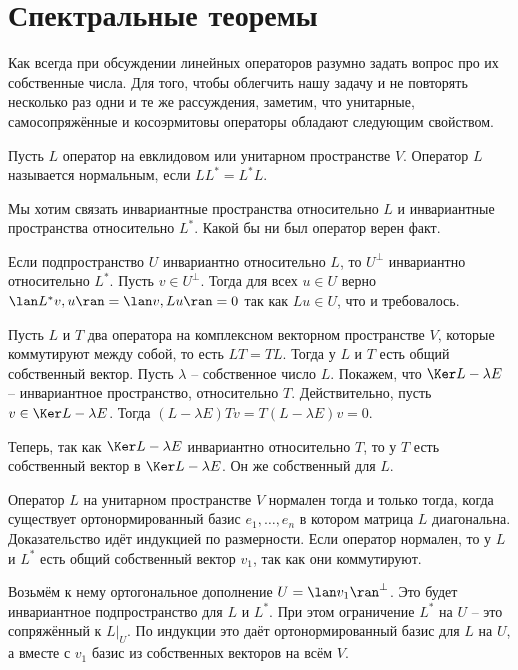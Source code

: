 \section{Спектральные теоремы}

Как всегда при обсуждении линейных операторов разумно задать вопрос про их собственные числа. Для того, чтобы облегчить нашу задачу и не повторять несколько раз одни и те же рассуждения, заметим, что унитарные, самосопряжённые и косоэрмитовы операторы обладают следующим свойством.

\dfn Пусть $L$ оператор на евклидовом или унитарном пространстве $V$. Оператор $L$ называется нормальным, если $LL^*=L^*L$.
\edfn



Мы хотим связать инвариантные пространства относительно $L$ и инвариантные пространства относительно $L^*$. Какой бы ни был оператор верен факт.

\lm \label{normal} Если подпространство $U$ инвариантно относительно $L$, то $U^{\bot}$ инвариантно относительно $L^{*}$.
\proof Пусть $v\in U^{\bot}$. Тогда для всех $u\in U$ верно $\lan L^* v, u\ran = \lan v, Lu\ran =0 $ так как $Lu\in U$, что и требовалось.
\endproof
\elm

\lm Пусть $L$ и $T$ два оператора на комплексном векторном пространстве $V$, которые коммутируют между собой, то есть $LT=TL$. Тогда у $L$ и $T$ есть общий собственный вектор. 
\proof Пусть $\lambda$ -- собственное число $L$. Покажем, что $\Ker L -\lambda E$ -- инвариантное пространство, относительно $T$. Действительно, пусть $v\in \Ker L-\lambda E$. Тогда $(L-\lambda E)Tv=T(L-\lambda E)v=0$.

Теперь, так как $\Ker L-\lambda E$ инвариантно относительно $T$, то у $T$ есть собственный вектор в $\Ker L-\lambda E$. Он же собственный для $L$.
\endproof
\elm

\thrm 
Оператор $L$ на  унитарном пространстве $V$ нормален тогда и только тогда, когда существует ортонормированный базис $e_1,\dots,e_n$ в котором матрица $L$ диагональна.
\proof
Доказательство идёт индукцией по размерности. Если оператор нормален, то у $L$ и $L^*$ есть общий собственный вектор $v_1$, так как они коммутируют.

Возьмём к нему ортогональное дополнение $U=\lan v_1\ran^{\bot}$. Это будет инвариантное подпространство для $L$ и $L^*$. При этом ограничение $L^*$ на $U$ -- это сопряжённый к $L|_U$. По индукции это даёт ортонормированный базис для $L$ на $U$, а вместе с $v_1$ базис из собственных векторов на всём $V$.
\endproof
\ethrm

